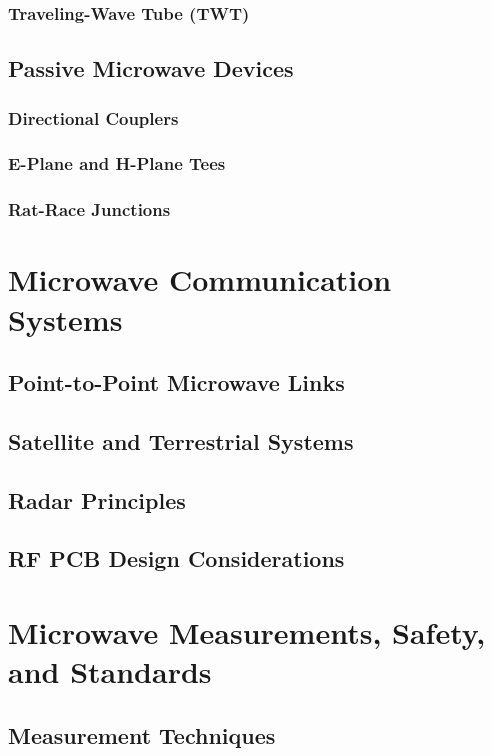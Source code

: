 \documentclass[11pt]{article}
\begin{document}
\subsubsection{Traveling-Wave Tube (TWT)}
\subsection{Passive Microwave Devices} \label{subsec:passive_microwave}
\subsubsection{Directional Couplers}
\subsubsection{E-Plane and H-Plane Tees}
\subsubsection{Rat-Race Junctions}

\section{Microwave Communication Systems} \label{sec:microwave_communications}
\subsection{Point-to-Point Microwave Links} \label{subsec:microwave_links}
\subsection{Satellite and Terrestrial Systems} \label{subsec:satellite_systems}
\subsection{Radar Principles} \label{subsec:radar}
\subsection{RF PCB Design Considerations} \label{subsec:rf_pcb}

\section{Microwave Measurements, Safety, and Standards}
\label{sec:microwave_measurements}
\subsection{Measurement Techniques} \label{subsec:measurement_techniques}
\end{document}
